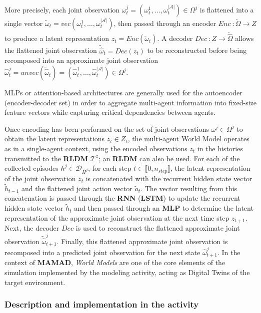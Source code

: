 \documentclass[pdflatex,sn-mathphys-num]{sn-jnl}%
\theoremstyle{thmstyleone}%
\theoremstyle{thmstyletwo}%
\theoremstyle{thmstylethree}%
\begin{document}

More precisely, each joint observation $\omega_t^{j} = (\omega_t^1, \dots, \omega_t^{|\mathcal{A}|}) \in \Omega^{j}$ is flattened into a single vector $\tilde{\omega}_t = vec (\omega_t^1, \dots, \omega_t^{|\mathcal{A}|})$, then passed through an encoder $Enc~: \tilde{\Omega}\rightarrow Z$ to produce a latent representation $z_t = Enc(\tilde{\omega}_t)$. A decoder $Dec~: Z \rightarrow \widetilde{\hat{\Omega}}$ allows the flattened joint observation $\widetilde{\hat{\omega}}_t = Dec(z_t)$ to be reconstructed before being recomposed into an approximate joint observation $\hat{\omega}_t^{j} = unvec(\widetilde{\hat{\omega}}_t) = (\hat{\omega}_t^1, \dots, \hat{\omega}_t^{|\mathcal{A}|}) \in \Omega^ {j}$.

MLPs or attention-based architectures are generally used for the autoencoder (encoder-decoder set) in order to aggregate multi-agent information into fixed-size feature vectors while capturing critical dependencies between agents.

Once encoding has been performed on the set of joint observations $\omega^j \in \Omega^{j}$ to obtain the latent representations $z_t \in Z_t$, the multi-agent World Model operates as in a single-agent context, using the encoded observations $z_t$ in the histories transmitted to the \textbf{RLDM} $\mathcal{T}^{z}$; an \textbf{RLDM} can also be used. For each of the collected episodes $h^j \in \mathcal{D}_{H^j} $, for each step $t \in \llbracket 0, n_{step} \rrbracket$, the latent representation of the joint observation $z_t$ is concatenated with the recurrent hidden state vector $\tilde{h}_{t-1}$ and the flattened joint action vector $\tilde{a}_t$. The vector resulting from this concatenation is passed through the \textbf{RNN} (\textbf{LSTM}) to update the recurrent hidden state vector $\tilde{h}_{t}$ and then passed through an \textbf{MLP} to determine the latent representation of the approximate joint observation at the next time step $z_{t+1} $. Next, the decoder $Dec$ is used to reconstruct the flattened approximate joint observation $\tilde{\hat{\omega}}_{t+1}^{j}$. Finally, this flattened approximate joint observation is recomposed into a predicted joint observation for the next state $\hat{\omega}_ {t+1}^{j}$. In the context of \textbf{MAMAD}, \textit{World Models} are one of the core elements of the simulation implemented by the modeling activity, acting as Digital Twins of the target environment.


\subsubsection*{Description and implementation in the activity}
\end{document}
